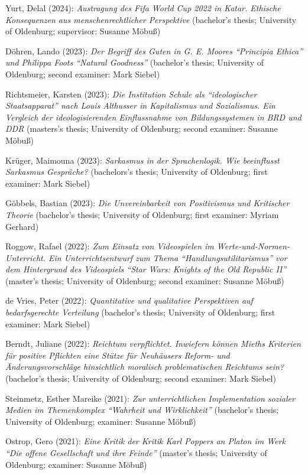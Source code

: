 \documentclass[a4paper,10pt]{article}
\newenvironment{literature}{%
   \parskip6pt\parindent0pt\raggedright
   \def\lititem{\hangindent=1cm\hangafter1}}{%
   \par\ignorespaces}
\begin{document}
\begin{literature}
\lititem Yurt, Delal (2024): \textit{Austragung des Fifa World Cup 2022 in Katar. Ethische Konsequenzen aus menschenrechtlicher Perspektive} (bachelor's thesis; University of Oldenburg; supervisor: Susanne Möbuß)

\lititem Döhren, Lando (2023): \textit{Der Begriff des Guten in G. E. Moores \enquote{Principia Ethica} und Philippa Foots \enquote{Natural Goodness}} (bachelor's thesis; University of Oldenburg; second examiner: Mark Siebel)

\lititem Richtsmeier, Karsten (2023): \textit{Die Institution Schule als \enquote{ideologischer Staatsapparat} nach Louis Althusser in Kapitalismus und Sozialismus. Ein Vergleich der ideologisierenden Einflussnahme von Bildungssystemen in BRD und DDR} (masters's thesis; University of Oldenburg; second examiner: Susanne Möbuß)

\lititem Krüger, Maimouna (2023): \textit{Sarkasmus in der Sprachenlogik. Wie beeinflusst Sarkasmus Gespräche?} (bachelors's thesis; University of Oldenburg; first examiner: Mark Siebel)

\lititem Göbbels, Bastian (2023): \textit{Die Unvereinbarkeit von Positivismus und Kritischer Theorie} (bachelor's thesis; University of Oldenburg; first examiner: Myriam Gerhard)

\lititem Roggow, Rafael (2022): \textit{Zum Einsatz von Videospielen im Werte-und-Normen-Unterricht. Ein Unterrichtsentwurf zum Thema \enquote{Handlungsutilitarismus} vor dem Hintergrund des Videospiels \enquote{Star Wars: Knights of the Old Republic II}} (master's thesis; University of Oldenburg; second examiner: Susanne Möbuß)

\lititem de Vries, Peter (2022): \textit{Quantitative und qualitative Perspektiven auf bedarfsgerechte Verteilung} (bachelor's thesis; University of Oldenburg; first examiner: Mark Siebel)

\lititem Berndt, Juliane (2022): \textit{Reichtum verpflichtet. Inwiefern können Mieths Kriterien für positive Pflichten eine Stütze für Neuhäusers Reform- und Änderungsvorschläge hinsichtlich moralisch problematischen Reichtums sein?} (bachelor's thesis; University of Oldenburg; second examiner: Mark Siebel)

\lititem Steinmetz, Esther Mareike (2021): \textit{Zur unterrichtlichen Implementation sozialer Medien im Themenkomplex \enquote{Wahrheit und Wirklichkeit}} (bachelor's thesis; University of Oldenburg; examiner: Susanne Möbuß)

\lititem Ostrop, Gero (2021): \textit{Eine Kritik der Kritik Karl Poppers an Platon im Werk \enquote{Die offene Gesellschaft und ihre Feinde}} (master's thesis; University of Oldenburg; examiner: Susanne Möbuß)


\end{literature}
\end{document}
